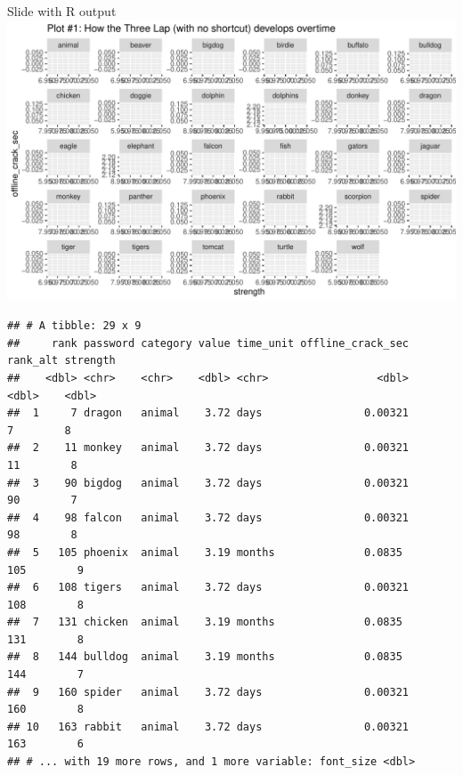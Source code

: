 \documentclass[10pt,ignorenonframetext,aspectratio=169]{beamer}
\begin{document}
\begin{frame}[fragile]{Slide with R output}
\protect\hypertarget{slide-with-r-output}{}
\includegraphics{Untitled_files/figure-beamer/p1-1.pdf}

\begin{verbatim}
## # A tibble: 29 x 9
##     rank password category value time_unit offline_crack_sec rank_alt strength
##    <dbl> <chr>    <chr>    <dbl> <chr>                 <dbl>    <dbl>    <dbl>
##  1     7 dragon   animal    3.72 days                0.00321        7        8
##  2    11 monkey   animal    3.72 days                0.00321       11        8
##  3    90 bigdog   animal    3.72 days                0.00321       90        7
##  4    98 falcon   animal    3.72 days                0.00321       98        8
##  5   105 phoenix  animal    3.19 months              0.0835       105        9
##  6   108 tigers   animal    3.72 days                0.00321      108        8
##  7   131 chicken  animal    3.19 months              0.0835       131        8
##  8   144 bulldog  animal    3.19 months              0.0835       144        7
##  9   160 spider   animal    3.72 days                0.00321      160        8
## 10   163 rabbit   animal    3.72 days                0.00321      163        6
## # ... with 19 more rows, and 1 more variable: font_size <dbl>
\end{verbatim}
\end{frame}
\end{document}

